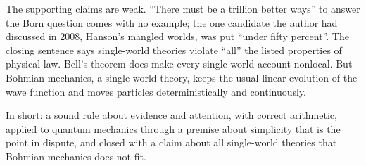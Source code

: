 \begin{afterword}
The supporting claims are weak. ``There must be a trillion better ways'' to answer the Born question comes with no example; the one candidate the author had discussed in 2008, Hanson's mangled worlds, was put ``under fifty percent''. The closing sentence says single-world theories violate ``all'' the listed properties of physical law. Bell's theorem does make every single-world account nonlocal. But Bohmian mechanics, a single-world theory, keeps the usual linear evolution of the wave function and moves particles deterministically and continuously.

In short: a sound rule about evidence and attention, with correct arithmetic, applied to quantum mechanics through a premise about simplicity that is the point in dispute, and closed with a claim about all single-world theories that Bohmian mechanics does not fit.
\end{afterword}
